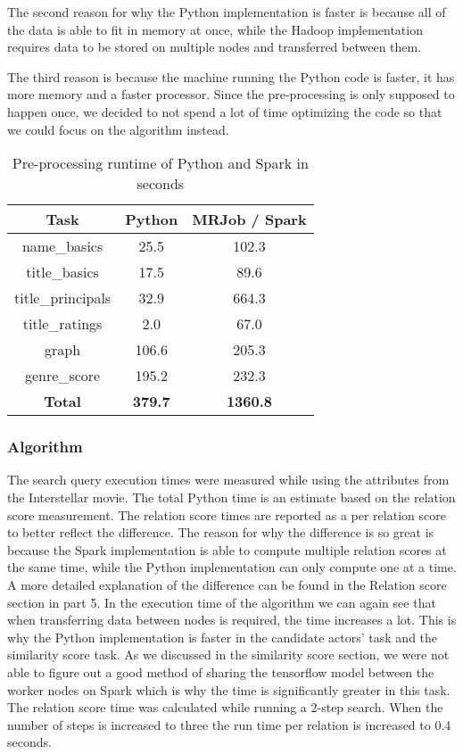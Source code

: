 The second reason for why the Python implementation is faster is because all of the data is able to fit in memory at once, while the Hadoop implementation requires data to be stored on multiple nodes and transferred between them. 

The third reason is because the machine running the Python code is faster, it has more memory and a faster processor. Since the pre-processing is only supposed to happen once, we decided to not spend a lot of time optimizing the code so that we could focus on the algorithm instead.

\begin{table}[H]
\centering
    \begin{tabular}{ |c|c|c| } 
        \hline
        \textbf{Task} & \textbf{Python} & \textbf{MRJob / Spark} \\ 
        \hline
        name\_basics & 25.5 & 102.3 \\ 
        title\_basics & 17.5 & 89.6 \\
        title\_principals & 32.9 & 664.3 \\ 
        title\_ratings & 2.0 & 67.0 \\ 
        graph & 106.6 & 205.3 \\ 
        genre\_score & 195.2 & 232.3 \\ \hline
        \textbf{Total} & \textbf{379.7} & \textbf{1360.8} \\ 
        \hline
    \end{tabular}
    \caption{Pre-processing runtime of Python and Spark in seconds}
    \label{tab:preprocess runtime}
\end{table}

\subsubsection{Algorithm}

The search query execution times were measured while using the attributes from the Interstellar movie. The total Python time is an estimate based on the relation score measurement. The relation score times are reported as a per relation score to better reflect the difference. The reason for why the difference is so great is because the Spark implementation is able to compute multiple relation scores at the same time, while the Python implementation can only compute one at a time. A more detailed explanation of the difference can be found in the Relation score section in part 5. In the execution time of the algorithm we can again see that when transferring data between nodes is required, the time increases a lot. This is why the Python implementation is faster in the candidate actors’ task and the similarity score task. As we discussed in the similarity score section, we were not able to figure out a good method of sharing the tensorflow model between the worker nodes on Spark which is why the time is significantly greater in this task. The relation score time was calculated while running a 2-step search. When the number of steps is increased to three the run time per relation is increased to 0.4 seconds.



